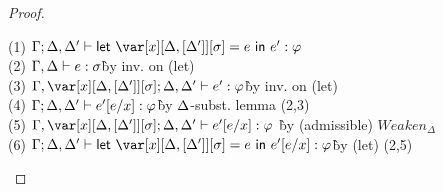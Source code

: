 \InliningTheorem

\begin{proof}~

\begin{tabbing}
    (1) $\G;\D,\D' \vdash \llet{\xD = e}{e'} : \vp$\\
    (2) $\Gamma,\Delta \vdash e : \sigma$\` by inv. on (let)\\
    (3) $\G,\xD; \D, \D' \vdash e' : \vp$\` by inv. on (let)\\
    (4) $\Gamma;\Delta,\Delta' \vdash e'[e/x] : \varphi$\` by $\Delta$-subst. lemma (2,3)\\
    (5) $\G,\xD; \D,\D' \vdash e'[e/x] : \vp$ \` by (admissible) $Weaken_\Delta$\\
    (6) $\G;\D,\D' \vdash \llet{\xD = e}{e'[e/x]} : \vp$\` by (let) (2,5)\\
\end{tabbing}
\end{proof}

